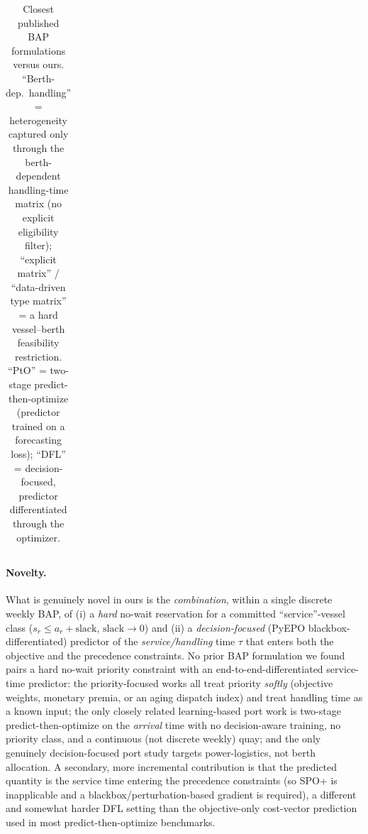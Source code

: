 \begin{table}[t]
\begin{tabular}{@{}p{2.7cm} p{2.3cm} p{2.4cm} p{2.2cm} p{2.0cm} p{2.3cm} p{1.6cm}@{}}
\bottomrule
\end{tabular}
\caption{Closest published BAP formulations versus ours. ``Berth-dep.\
handling'' = heterogeneity captured only through the berth-dependent
handling-time matrix (no explicit eligibility filter); ``explicit matrix'' /
``data-driven type matrix'' = a hard vessel--berth feasibility restriction.
``PtO'' = two-stage predict-then-optimize (predictor trained on a forecasting
loss); ``DFL'' = decision-focused, predictor differentiated through the
optimizer.}
\label{tab:related_bap}
\end{table}

\paragraph{Novelty.}
What is genuinely novel in ours is the \emph{combination}, within a single
discrete weekly BAP, of (i) a \emph{hard} no-wait reservation for a committed
``service''-vessel class ($s_r \le a_r + \mathrm{slack}$,
$\mathrm{slack}\!\to\!0$) and (ii) a \emph{decision-focused} (PyEPO
blackbox-differentiated) predictor of the \emph{service/handling} time $\tau$
that enters both the objective and the precedence constraints. No prior BAP
formulation we found pairs a hard no-wait priority constraint with an
end-to-end-differentiated service-time predictor: the priority-focused works
\citep{Ursavas2022PriorityControlBAP, alzaabi2016berth, cordeau2005berth,
golias2007berth} all treat priority \emph{softly} (objective weights, monetary
premia, or an aging dispatch index) and treat handling time as a known input;
the only closely related learning-based port work \citep{chu2025integrating} is
two-stage predict-then-optimize on the \emph{arrival} time with no
decision-aware training, no priority class, and a continuous (not discrete
weekly) quay; and the only genuinely decision-focused port study
\citep{pu2025predictthenoptimize} targets power-logistics, not berth allocation.
A secondary, more incremental contribution is that the predicted quantity is the
service time entering the precedence constraints (so SPO+ is inapplicable and a
blackbox/perturbation-based gradient is required), a different and somewhat
harder DFL setting than the objective-only cost-vector prediction used in most
predict-then-optimize benchmarks.

